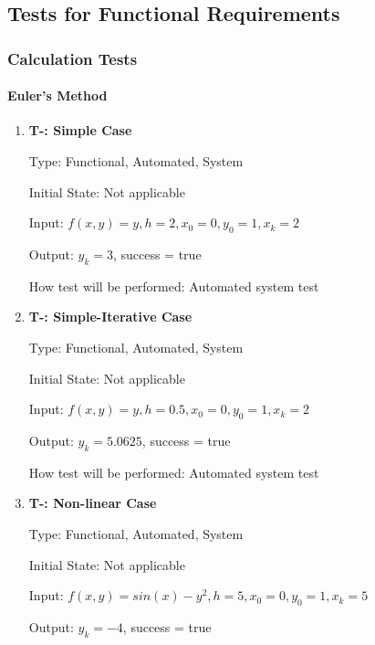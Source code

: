 \documentclass[12pt, titlepage]{article}
\newcounter{tnum} %
\begin{document}
\subsection{Tests for Functional Requirements}

\subsubsection{Calculation Tests}
		
\paragraph{Euler's Method}

\begin{enumerate}

\item{\textbf{T-\thetnum \label{t-euler_simple}: Simple Case}}

Type: Functional, Automated, System %
					
Initial State: Not applicable
					
Input: $f(x, y) = y, h = 2, x_0 = 0, y_0 = 1, x_k = 2$
					
Output: $y_k = 3$, success = true
					
How test will be performed: Automated system test

\item{\textbf{T-\thetnum \label{t-euler_simpleiterative}: Simple-Iterative Case}}

Type: Functional, Automated, System %
					
Initial State: Not applicable
					
Input: $f(x, y) = y, h = 0.5, x_0 = 0, y_0 = 1, x_k = 2$
					
Output: $y_k = 5.0625$, success = true
					
How test will be performed: Automated system test

\item{\textbf{T-\thetnum \label{t-euler_nonlinear}: Non-linear Case}}

Type: Functional, Automated, System %
					
Initial State: Not applicable
					
Input: $f(x, y) = sin(x) - y^2, h = 5, x_0 = 0, y_0 = 1, x_k = 5$
					
Output: $y_k = -4$, success = true
					

\end{enumerate}
\end{document}
